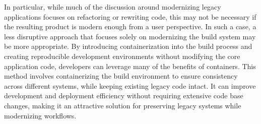 In particular, while much of the discussion around modernizing legacy applications focuses on refactoring or rewriting code, this may not be necessary if the resulting product is modern enough from a user perspective.
In such a case, a less disruptive approach that focuses solely on modernizing the build system may be more appropriate.
By introducing containerization into the build process and creating reproducible development environments without modifying the core application code, developers can leverage many of the benefits of containers.
This method involves containerizing the build environment to ensure consistency across different systems, while keeping existing legacy code intact.
It can improve development and deployment efficiency without requiring extensive code base changes, making it an attractive solution for preserving legacy systems while modernizing workflows.










